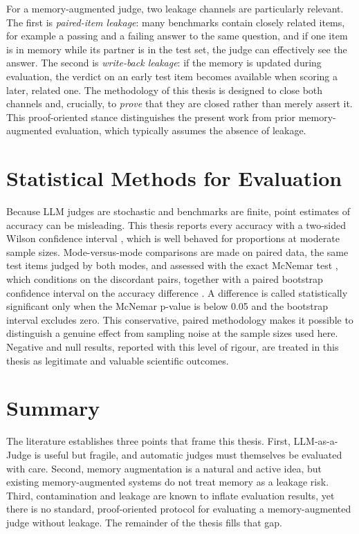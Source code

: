 \documentclass[14pt,a4paper]{extreport}
\begin{document}
For a memory-augmented judge, two leakage channels are particularly relevant. The first is \emph{paired-item leakage}: many benchmarks contain closely related items, for example a passing and a failing answer to the same question, and if one item is in memory while its partner is in the test set, the judge can effectively see the answer. The second is \emph{write-back leakage}: if the memory is updated during evaluation, the verdict on an early test item becomes available when scoring a later, related one. The methodology of this thesis is designed to close both channels and, crucially, to \emph{prove} that they are closed rather than merely assert it. This proof-oriented stance distinguishes the present work from prior memory-augmented evaluation, which typically assumes the absence of leakage.

\section{Statistical Methods for Evaluation}

Because LLM judges are stochastic and benchmarks are finite, point estimates of accuracy can be misleading. This thesis reports every accuracy with a two-sided Wilson confidence interval \cite{wilson1927}, which is well behaved for proportions at moderate sample sizes. Mode-versus-mode comparisons are made on paired data, the same test items judged by both modes, and assessed with the exact McNemar test \cite{mcnemar1947}, which conditions on the discordant pairs, together with a paired bootstrap confidence interval on the accuracy difference \cite{bootstrap1993}. A difference is called statistically significant only when the McNemar p-value is below 0.05 and the bootstrap interval excludes zero. This conservative, paired methodology makes it possible to distinguish a genuine effect from sampling noise at the sample sizes used here. Negative and null results, reported with this level of rigour, are treated in this thesis as legitimate and valuable scientific outcomes.

\section{Summary}

The literature establishes three points that frame this thesis. First, LLM-as-a-Judge is useful but fragile, and automatic judges must themselves be evaluated with care. Second, memory augmentation is a natural and active idea, but existing memory-augmented systems do not treat memory as a leakage risk. Third, contamination and leakage are known to inflate evaluation results, yet there is no standard, proof-oriented protocol for evaluating a memory-augmented judge without leakage. The remainder of the thesis fills that gap.
\end{document}
